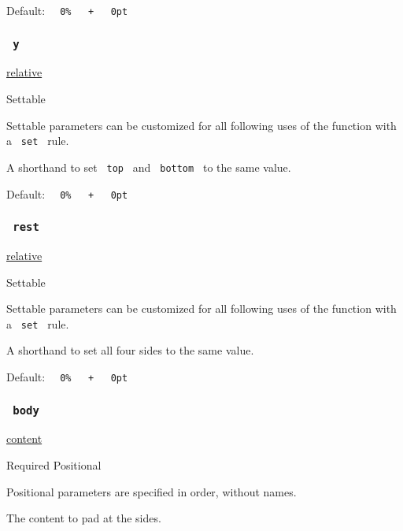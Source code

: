 Default:
\texttt{\ }{\texttt{\ 0\%\ }}\texttt{\ }{\texttt{\ +\ }}\texttt{\ }{\texttt{\ 0pt\ }}\texttt{\ }

\subsubsection{\texorpdfstring{\texttt{\ y\ }}{ y }}\label{parameters-y}

\href{/docs/reference/layout/relative/}{relative}

{{ Settable }}

\label{parameters-y-settable-tooltip}
Settable parameters can be customized for all following uses of the
function with a \texttt{\ set\ } rule.

A shorthand to set \texttt{\ top\ } and \texttt{\ bottom\ } to the same
value.

Default:
\texttt{\ }{\texttt{\ 0\%\ }}\texttt{\ }{\texttt{\ +\ }}\texttt{\ }{\texttt{\ 0pt\ }}\texttt{\ }

\subsubsection{\texorpdfstring{\texttt{\ rest\ }}{ rest }}\label{parameters-rest}

\href{/docs/reference/layout/relative/}{relative}

{{ Settable }}

\label{parameters-rest-settable-tooltip}
Settable parameters can be customized for all following uses of the
function with a \texttt{\ set\ } rule.

A shorthand to set all four sides to the same value.

Default:
\texttt{\ }{\texttt{\ 0\%\ }}\texttt{\ }{\texttt{\ +\ }}\texttt{\ }{\texttt{\ 0pt\ }}\texttt{\ }

\subsubsection{\texorpdfstring{\texttt{\ body\ }}{ body }}\label{parameters-body}

\href{/docs/reference/foundations/content/}{content}

{Required} {{ Positional }}

\label{parameters-body-positional-tooltip}
Positional parameters are specified in order, without names.

The content to pad at the sides.

\href{/docs/reference/layout/move/}{\pandocbounded{}}

